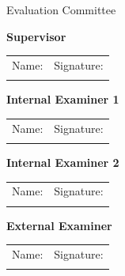 \clearpage
\begin{center}
    {\headingfont\LARGE Evaluation Committee}
\end{center}

\vspace{1.7cm}

\begin{center}
    \begin{framed}
        \textbf{Supervisor} \\
        \vspace{0.7cm}
        \begin{tabularx}{\linewidth}{@{}XX@{}}
            Name: \hrulefill & Signature: \hrulefill \\
            \vspace{0.2cm}
        \end{tabularx}
    \end{framed}

    \vspace{1cm}

    \begin{framed}
        \textbf{Internal Examiner 1} \\
        \vspace{0.7cm}
        \begin{tabularx}{\linewidth}{@{}XX@{}}
            Name: \hrulefill & Signature: \hrulefill \\
            \vspace{0.2cm}
        \end{tabularx}
    \end{framed}

    \vspace{1cm}

    \begin{framed}
        \textbf{Internal Examiner 2} \\
        \vspace{0.7cm}
        \begin{tabularx}{\linewidth}{@{}XX@{}}
            Name: \hrulefill & Signature: \hrulefill \\
            \vspace{0.2cm}
        \end{tabularx}
    \end{framed}

    \vspace{1cm}

    \begin{framed}
        \textbf{External Examiner} \\
        \vspace{0.7cm}
        \begin{tabularx}{\linewidth}{@{}XX@{}}
            Name: \hrulefill & Signature: \hrulefill \\
            \vspace{0.2cm}
        \end{tabularx}
    \end{framed}
\end{center}
